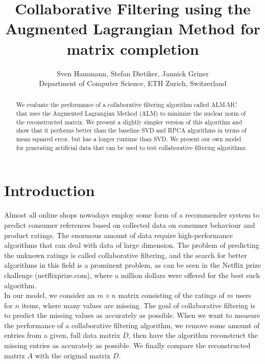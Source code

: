 \documentclass[10pt,conference,compsocconf]{IEEEtran}
\begin{document}
\title{Collaborative Filtering using the Augmented Lagrangian Method for matrix completion}

\author{
  Sven Hammann, Stefan Dietiker, Jannick Griner\\
  Department of Computer Science, ETH Zurich, Switzerland
}



\maketitle

\begin{abstract}
We evaluate the performance of a collaborative filtering algorithm called ALM-MC that uses the
Augmented Lagrangian Method (ALM) to minimize the nuclear norm of the reconstructed matrix.
We present a slightly simpler version of this algorithm and show that it performs better than the baseline
SVD and RPCA algorithms in terms of mean squared error, but has a longer runtime than SVD. We present our own 
model for generating artificial data that can be used to test collaborative filtering algorithms.
\end{abstract}

\section{Introduction}
Almost all online shops nowadays employ some form of a recommender system to predict consumer references based on collected data on consumer behaviour and product ratings. The enormous amount of data require high-performance algorithms that can deal with data of large dimension. The problem of predicting the unknown ratings is called collaborative filtering, and the search for better algorithms in this field is a prominent problem, as can be seen in the Netflix prize challenge (netflixprize.com), where a million dollars were offered for the best such algorithm. \\

In our model, we consider an $m \times n$ matrix consisting of the ratings of $m$ users for $n$ items,
where many values are missing. The goal of collaborative filtering is to predict the missing values as accurately as possible. 
When we want to measure the performance of a collaborative filtering algorithm, we remove some amount of entries from a given, full data matrix $D$, then have the algorithm reconstruct the missing entries as accurately as possible. We finally compare the reconstructed matrix $A$ with the original matrix $D$. \\
\end{document}
